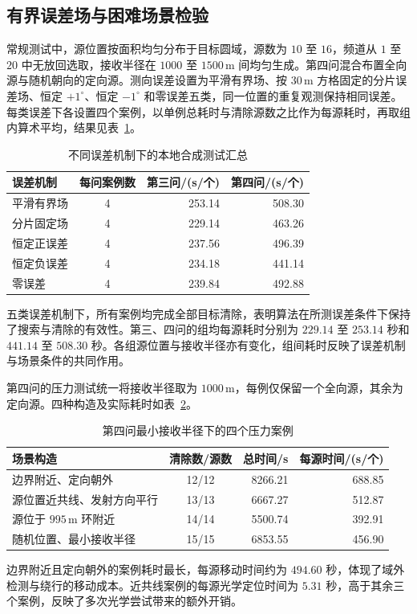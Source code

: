 \documentclass[withoutpreface,bwprint]{cumcmthesis} %
\begin{document}
\subsection{有界误差场与困难场景检验}
常规测试中，源位置按面积均匀分布于目标圆域，源数为 $10$ 至 $16$，频道从 $1$ 至 $20$ 中无放回选取，接收半径在 $1000$ 至 $1500\,\mathrm m$ 间均匀生成。第四问混合布置全向源与随机朝向的定向源。测向误差设置为平滑有界场、按 $30\,\mathrm m$ 方格固定的分片误差场、恒定 $+1^\circ$、恒定 $-1^\circ$ 和零误差五类，同一位置的重复观测保持相同误差。每类误差下各设置四个案例，以单例总耗时与清除源数之比作为每源耗时，再取组内算术平均，结果见表~\ref{tab:error-fields}。
\begin{table}[htbp]
\centering\caption{不同误差机制下的本地合成测试汇总}\label{tab:error-fields}
\begin{tabular}{lcrr}
\toprule
误差机制 & 每问案例数 & 第三问/(s/个) & 第四问/(s/个)\\
\midrule
平滑有界场 &4&253.14&508.30\\
分片固定场 &4&229.14&463.26\\
恒定正误差 &4&237.56&496.39\\
恒定负误差 &4&234.18&441.14\\
零误差 &4&239.84&492.88\\
\bottomrule
\end{tabular}
\end{table}
五类误差机制下，所有案例均完成全部目标清除，表明算法在所测误差条件下保持了搜索与清除的有效性。第三、四问的组均每源耗时分别为 $229.14$ 至 $253.14$ 秒和 $441.14$ 至 $508.30$ 秒。各组源位置与接收半径亦有变化，组间耗时反映了误差机制与场景条件的共同作用。

第四问的压力测试统一将接收半径取为 $1000\,\mathrm m$，每例仅保留一个全向源，其余为定向源。四种构造及实际耗时如表~\ref{tab:q4-stress}。
\begin{table}[htbp]
\centering\caption{第四问最小接收半径下的四个压力案例}\label{tab:q4-stress}
\begin{tabular}{p{6.0cm}crr}
\toprule
场景构造 & 清除数/源数 & 总时间/s & 每源时间/(s/个)\\
\midrule
边界附近、定向朝外 &12/12&8266.21&688.85\\
源位置近共线、发射方向平行 &13/13&6667.27&512.87\\
源位于 $995\,\mathrm m$ 环附近 &14/14&5500.74&392.91\\
随机位置、最小接收半径 &15/15&6853.55&456.90\\
\bottomrule
\end{tabular}
\end{table}
边界附近且定向朝外的案例耗时最长，每源移动时间约为 $494.60$ 秒，体现了域外检测与绕行的移动成本。近共线案例的每源光学定位时间为 $5.31$ 秒，高于其余三个案例，反映了多次光学尝试带来的额外开销。
\end{document}
